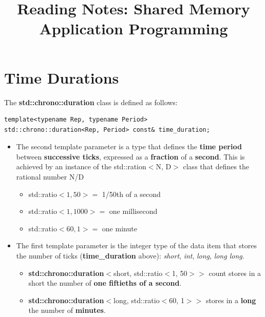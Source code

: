 \documentclass[12pt,a4paper]{article}
\title{Reading Notes: Shared Memory Application Programming}
\begin{document}
\maketitle


\section{Time Durations}
The \textbf{std::chrono::duration} class is defined as follows:
\begin{lstlisting}
template<typename Rep, typename Period>
std::chrono::duration<Rep, Period> const& time_duration;
\end{lstlisting}
\begin{itemize}
	\item  The second template parameter is a type that defines the \textbf{time period} between \textbf{successive ticks}, expressed as a \textbf{fraction} of a \textbf{second}. This is achieved by an instance of the std::ration$<$N, D$>$ class that defines the rational number N/D
	\begin{itemize}
		\item std::ratio$<1,50> =$ 1/50th of a second
		\item std::ratio$<1,1000>=$ one millisecond
		\item std::ratio$<60,1>=$ one minute
	\end{itemize}
\item The first template parameter is the integer type of the data item that stores the number of ticks (\textbf{time\_duration} above): \textit{short}, \textit{int}, \textit{long}, \textit{long long}.
\begin{itemize}
	\item \textbf{std::chrono::duration}$<$short, std::ratio$<$1, 50$>>$ count stores in a short the number of \textbf{one fiftieths of a second}.
	\item \textbf{std::chrono::duration}$<$long, std::ratio$<$60, 1$>>$ stores in a \textbf{long} the number of \textbf{minutes}.
\end{itemize}
\end{itemize}
\end{document}
